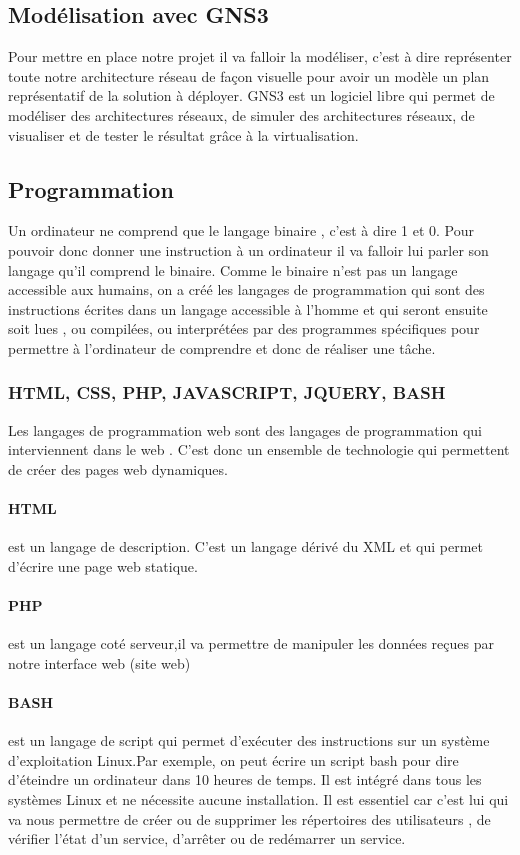 \documentclass[a4paper,12pt,french]{report} %
\begin{document}
\subsection{Modélisation avec GNS3}
Pour mettre en place notre projet il va falloir la modéliser, c'est à dire représenter toute notre architecture réseau de façon visuelle pour avoir un modèle un plan représentatif de la solution à déployer. GNS3 est un logiciel libre qui permet de modéliser des architectures réseaux, de simuler des architectures réseaux, de visualiser et de tester le résultat grâce à la virtualisation.
\subsection{Programmation}
Un ordinateur ne comprend que le langage binaire , c'est à dire  1 et 0. Pour pouvoir donc donner une instruction à un ordinateur il va falloir lui parler son langage qu'il comprend le binaire. Comme le binaire n'est pas un langage accessible aux humains, on a créé les langages de programmation qui sont des instructions écrites dans un langage accessible à l'homme et qui seront ensuite soit lues , ou compilées, ou  interprétées par des programmes spécifiques pour permettre à l'ordinateur de comprendre et donc de réaliser une tâche.
\subsubsection{HTML, CSS, PHP, JAVASCRIPT, JQUERY, BASH}
Les langages de programmation  web sont des langages de programmation qui interviennent dans le web . C'est donc un ensemble de technologie qui permettent de créer des pages web dynamiques.
\paragraph{HTML} est un langage de description. C'est un langage dérivé du XML et qui permet d'écrire une page web statique. 
\paragraph{PHP} est un langage coté serveur,il va permettre de manipuler les données reçues par notre interface web (site web)
\paragraph{BASH} est un langage de script qui permet d'exécuter des instructions sur un système d'exploitation Linux.Par exemple, on peut écrire un script bash pour dire d'éteindre un ordinateur dans 10 heures de temps. Il est intégré dans tous les systèmes Linux et ne nécessite aucune installation. Il est essentiel car c'est lui qui va nous permettre de créer ou de supprimer les répertoires des utilisateurs , de vérifier l'état d'un service, d'arrêter ou de redémarrer un service.
\end{document}

